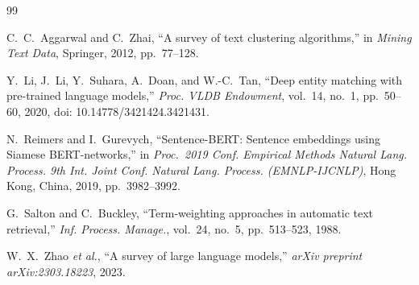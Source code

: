 \documentclass[conference]{IEEEtran}
\begin{document}
\begin{thebibliography}{99}
\footnotesize
\setlength{\itemsep}{1pt}
\setlength{\parskip}{0pt}

C.~C.~Aggarwal and C.~Zhai, ``A survey of text clustering algorithms,'' in \textit{Mining Text Data}, Springer, 2012, pp.\ 77--128.

Y.~Li, J.~Li, Y.~Suhara, A.~Doan, and W.-C.~Tan, ``Deep entity matching with pre-trained language models,'' \textit{Proc. VLDB Endowment}, vol.~14, no.~1, pp.~50--60, 2020, doi: 10.14778/3421424.3421431.

N.~Reimers and I.~Gurevych, ``Sentence-BERT: Sentence embeddings using Siamese BERT-networks,'' in \textit{Proc.\ 2019 Conf. Empirical Methods Natural Lang. Process. 9th Int. Joint Conf. Natural Lang. Process. (EMNLP-IJCNLP)}, Hong Kong, China, 2019, pp.\ 3982--3992.

G.~Salton and C.~Buckley, ``Term-weighting approaches in automatic text retrieval,'' \textit{Inf. Process. Manage.}, vol.~24, no.~5, pp.\ 513--523, 1988.

W.~X.~Zhao \textit{et al.}, ``A survey of large language models,'' \textit{arXiv preprint arXiv:2303.18223}, 2023.

\end{thebibliography}
\end{document}
